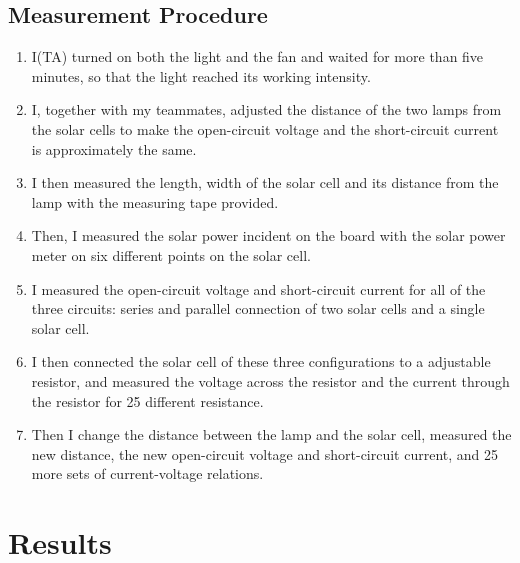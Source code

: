 \documentclass[a4paper]{article}
\begin{document}
    \subsection{Measurement Procedure}
    \begin{enumerate}
        \item I(TA) turned on both the light and the fan and waited for more than five minutes, so that the light reached its working intensity.
        \item I, together with my teammates, adjusted the distance of the two lamps from the solar cells to make the open-circuit voltage and the short-circuit current is approximately the same. 
        \item I then measured the length, width of the solar cell and its distance from the lamp with the measuring tape provided. 
        \item Then, I measured the solar power incident on the board with the solar power meter on six different points on the solar cell. 
        \item I measured the open-circuit voltage and short-circuit current for all of the three circuits: series and parallel connection of two solar cells and a single solar cell. 
        \item I then connected the solar cell of these three configurations to a adjustable resistor, and measured the voltage across the resistor and the current through the resistor for 25 different resistance.
        \item Then I change the distance between the lamp and the solar cell, measured the new distance, the new open-circuit voltage and short-circuit current, and 25 more sets of current-voltage relations.
    \end{enumerate}
    \section{Results}
\end{document}
